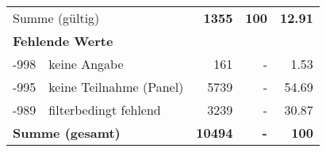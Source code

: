 \begin{longtable}{lXrrr}
     \midrule
     \multicolumn{2}{l}{Summe (gültig)} &
       \textbf{\num{1355}} &
     \textbf{\num{100}} &
       \textbf{\num[round-mode=places,round-precision=2]{12.91}} \\
     \multicolumn{5}{l}{\textbf{Fehlende Werte}}\\
       -998 &
       keine Angabe &
         \num{161} &
        - &
         \num[round-mode=places,round-precision=2]{1.53} \\
       -995 &
       keine Teilnahme (Panel) &
         \num{5739} &
        - &
         \num[round-mode=places,round-precision=2]{54.69} \\
       -989 &
       filterbedingt fehlend &
         \num{3239} &
        - &
         \num[round-mode=places,round-precision=2]{30.87} \\
     \midrule
     \multicolumn{2}{l}{\textbf{Summe (gesamt)}} &
          \textbf{\num{10494}} &
        \textbf{-} &
        \textbf{\num{100}} \\
     \bottomrule
     \end{longtable}
     
